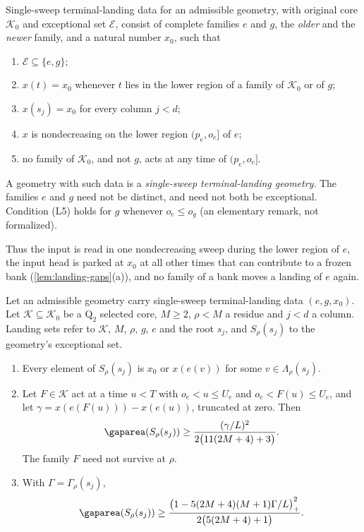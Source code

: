\begin{definition}\label{def:terminal-landing}
Single-sweep terminal-landing data for an admissible geometry, with original core
$\mathcal K_0$ and exceptional set $\mathcal E$, consist of complete families $e$ and
$g$, the \emph{older} and the \emph{newer} family, and a natural number $x_0$, such that
\begin{enumerate}[label=(L\arabic*)]
\item $\mathcal E\subseteq\{e,g\}$;
\item $x(t)=x_0$ whenever $t$ lies in the lower region of a family of $\mathcal K_0$ or
of $g$;
\item $x(s_j)=x_0$ for every column $j<d$;
\item $x$ is nondecreasing on the lower region $(p_e,o_e]$ of $e$;
\item no family of $\mathcal K_0$, and not $g$, acts at any time of $(p_e,o_e]$.
\end{enumerate}
A geometry with such data is a \emph{single-sweep terminal-landing geometry}.
The families $e$ and $g$ need not be distinct, and need not both be exceptional.
Condition (L5) holds for $g$ whenever $o_e\le o_g$ (an elementary remark, not
formalized).
\end{definition}

Thus the input is read in one nondecreasing sweep during the lower region of $e$,
the input head is parked at $x_0$ at all other times that can contribute to a frozen
bank (\cref{lem:landing-gaps}(a)), and no family of a bank moves a landing of $e$
again.

\begin{lemma}\label{lem:landing-gaps}
Let an admissible geometry carry single-sweep terminal-landing data $(e,g,x_0)$. Let
$\mathcal K\subseteq\mathcal K_0$ be a $\mathrm Q_2$ selected core, $M\ge2$, $\rho<M$ a
residue and $j<d$ a column. Landing sets refer to $\mathcal K$, $M$, $\rho$, $g$, $e$
and the root $s_j$, and $S_\rho(s_j)$ to the geometry's exceptional set.
\begin{enumerate}[label=(\alph*)]
\item Every element of $S_\rho(s_j)$ is $x_0$ or $x(e(v))$ for some
$v\in\Lambda_\rho(s_j)$.
\item Let $F\in\mathcal K$ act at a time $u<T$ with $o_e<u\le U_e$ and
$o_e<F(u)\le U_e$, and let $\gamma=x(e(F(u)))-x(e(u))$, truncated at zero. Then
\[
 \gaparea(S_\rho(s_j))\ge\frac{(\gamma/L)^2}{2\bigl(11(2M+4)+3\bigr)}.
\]
The family $F$ need not survive at $\rho$.
\item With $\Gamma=\Gamma_\rho(s_j)$,
\[
 \gaparea(S_\rho(s_j))\ge
 \frac{\bigl(1-5(2M+4)(M+1)\Gamma/L\bigr)_+^2}{2\bigl(5(2M+4)+1\bigr)}.
\]
\end{enumerate}
\end{lemma}

